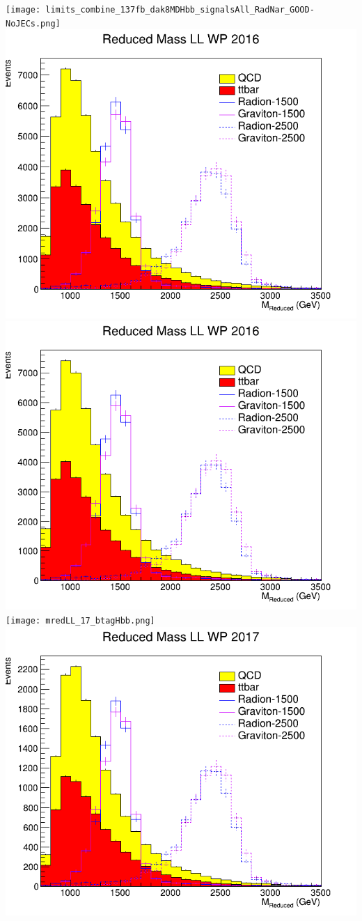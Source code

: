 \texttt{[image: limits\_combine\_137fb\_dak8MDHbb\_signalsAll\_RadNar\_GOOD-NoJECs.png]}
\includegraphics[width=1\textwidth]{mredLL_16_btagHbb.png}
\includegraphics[width=1\textwidth]{mredLL_16_deepTagMD_HbbvsQCD.png}
\texttt{[image: mredLL\_17\_btagHbb.png]}
\includegraphics[width=1\textwidth]{mredLL_17_deepTagMD_HbbvsQCD.png}
